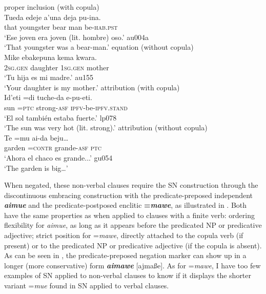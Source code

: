 \documentclass[output=paper]{langsci/langscibook}
\begin{document}
\begin{exe}\ex\label{ex:tacana-bearman-mother}
\begin{xlist}
\ex\label{ex:tacana-bearman} 
proper inclusion (with copula)\\
\gll {}Tueda edeje{\cb} a'una deja{\cb} pu-ina.\\
    that  youngster  bear  man  be-\textsc{hab.pst}\\
\glt`Ese joven era joven (lit. hombre) oso.' au004a\\
`That youngster was a bear-man.'
\ex\label{ex:tacana-mother} 
 equation (without copula)\\
\gll {}Mike ebakepuna{\cb} kema kwara{\cb}.\\
 \textsc{2sg.gen}  daughter  \textsc{1sg.gen}  mother\\
\glt `Tu hija es mi madre.' au155\\
`Your daughter is my mother.'
\ex\label{ex:tacana-veryhot}
 attribution (with copula)\\
\gll {}Id'eti  =di tuche-da e-pu-eti.\\
    sun  =\textsc{ptc}  strong-\textsc{asf}
    \textsc{ipfv}-be-\textsc{ipfv.stand}\\
\glt `El sol también estaba fuerte.' lp078\\
`The sun was very hot (lit. strong).' 
\ex\label{ex:tacana-garden}
 attribution (without copula)\\
\gll {}Te  =mu ai-da  beju…\\
    garden  =\textsc{contr}  grande-\textsc{asf}  \textsc{ptc}\\
\glt `Ahora el chaco es grande...' gu054\\
`The garden is big…' 
\end{xlist}\end{exe}

When negated, these non-verbal clauses require the SN construction through
the discontinuous embracing construction with the predicate-preposed
independent \textbf{\textit{aimue}} and the predicate-postposed enclitic
\textbf{=\textit{mawe}}, as illustrated in .
Both have the same properties as when applied to clauses with a finite
verb: ordering flexibility for \textit{aimue}, as long as it appears before
the predicated NP or predicative adjective; strict position for
=\textit{mawe}, directly attached to the copula verb (if present) or to the
predicated NP or predicative adjective (if the copula is absent). As can be
seen in , the predicate-preposed negation marker can show up in a longer (more conservative) form \textbf{\textit{aimawe}} [ajmaße]. As for =\textit{mawe}, I have too few examples of SN applied to non-verbal clauses to know if it displays the shorter variant =\textit{mue} found in SN applied to verbal clauses.
\end{document}
